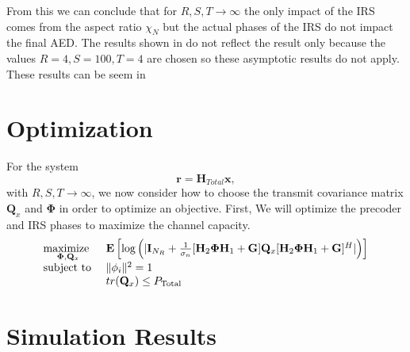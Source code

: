 \documentclass[12pt,a4paper]{report}
\begin{document}
From this we can conclude that for $R,S,T \rightarrow \infty $ the only impact of the IRS comes from the aspect ratio
$\chi_N$ but the actual phases of the IRS do not impact the final AED.
The results shown in \cite{zhang2019capacity} do not reflect the result only because 
the values $R = 4, S = 100 , T = 4$ are chosen so these asymptotic results do not apply. 
These results can be seem in 

\section{Optimization}
For the system
\begin{equation}
		\mathbf{r} = \mathbf{H}_{Total}\mathbf{x},
	\end{equation}
	with  $R,S,T \rightarrow \infty $,
we now consider
how to choose the transmit covariance matrix $\mathbf{Q}_x$ and $\boldsymbol{\Phi}$ in order to optimize an objective.
First, We will optimize the precoder and IRS phases to maximize the channel capacity.
		    \begin{equation}
    \begin{array}{ll}
    \underset{\boldsymbol{\Phi}, \mathbf{Q}_x}{\text{maximize }}   & \mathop{\bf E{}}\left[\text{log{}}\left(|\mathbf{I}_{N_R}+\frac{1}{\sigma_n}[\mathbf{H}_{2}\boldsymbol{\Phi}\mathbf{H}_{1} + \mathbf{G}]\mathbf{Q}_x[\mathbf{H}_{2}\boldsymbol{\Phi}\mathbf{H}_{1} + \mathbf{G}]^H|\right)\right]
    \\
    \mbox{subject to } & \|\phi_i\|^2 = 1
    \\
    & tr(\mathbf{Q}_x) \leq P_{\text{Total}}
    \end{array}
    \label{general_irs_opt}
    \end{equation} 
    
    

\section{Simulation Results}
\end{document}
